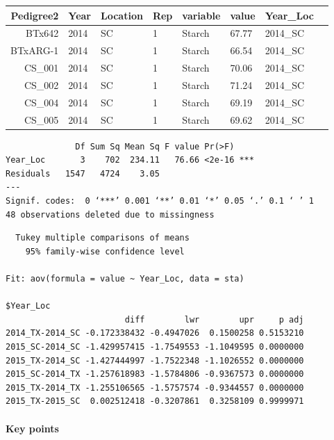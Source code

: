 \documentclass[11pt]{article}
\begin{document}
    
    \begin{tabular}{r|lllllll}
 Pedigree2 & Year & Location & Rep & variable & value & Year\_Loc\\
\hline
	 BTx642    & 2014      & SC        & 1         & Starch    & 67.77     & 2014\_SC\\
	 BTxARG-1  & 2014      & SC        & 1         & Starch    & 66.54     & 2014\_SC\\
	 CS\_001   & 2014       & SC         & 1          & Starch     & 70.06      & 2014\_SC \\
	 CS\_002   & 2014       & SC         & 1          & Starch     & 71.24      & 2014\_SC \\
	 CS\_004   & 2014       & SC         & 1          & Starch     & 69.19      & 2014\_SC \\
	 CS\_005   & 2014       & SC         & 1          & Starch     & 69.62      & 2014\_SC \\
\end{tabular}


    
    
    \begin{verbatim}
              Df Sum Sq Mean Sq F value Pr(>F)    
Year_Loc       3    702  234.11   76.66 <2e-16 ***
Residuals   1547   4724    3.05                   
---
Signif. codes:  0 ‘***’ 0.001 ‘**’ 0.01 ‘*’ 0.05 ‘.’ 0.1 ‘ ’ 1
48 observations deleted due to missingness
    \end{verbatim}

    
    
    \begin{verbatim}
  Tukey multiple comparisons of means
    95% family-wise confidence level

Fit: aov(formula = value ~ Year_Loc, data = sta)

$Year_Loc
                        diff        lwr        upr     p adj
2014_TX-2014_SC -0.172338432 -0.4947026  0.1500258 0.5153210
2015_SC-2014_SC -1.429957415 -1.7549553 -1.1049595 0.0000000
2015_TX-2014_SC -1.427444997 -1.7522348 -1.1026552 0.0000000
2015_SC-2014_TX -1.257618983 -1.5784806 -0.9367573 0.0000000
2015_TX-2014_TX -1.255106565 -1.5757574 -0.9344557 0.0000000
2015_TX-2015_SC  0.002512418 -0.3207861  0.3258109 0.9999971

    \end{verbatim}

    
    \paragraph{Key points}\label{key-points}
\end{document}
